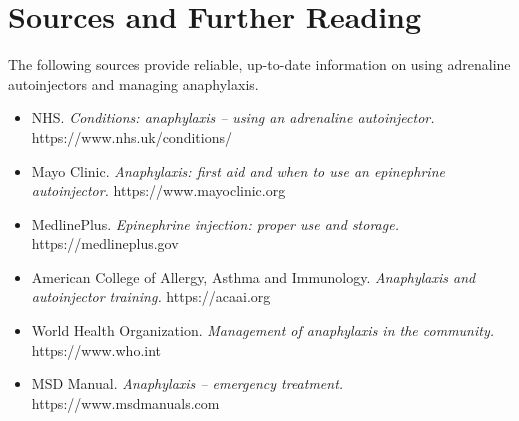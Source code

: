 \section*{Sources and Further Reading}
The following sources provide reliable, up-to-date information on using adrenaline autoinjectors and managing anaphylaxis.

\begin{itemize}
    \item NHS. \textit{Conditions: anaphylaxis -- using an adrenaline autoinjector.} https://www.nhs.uk/conditions/
    \item Mayo Clinic. \textit{Anaphylaxis: first aid and when to use an epinephrine autoinjector.} https://www.mayoclinic.org
    \item MedlinePlus. \textit{Epinephrine injection: proper use and storage.} https://medlineplus.gov
    \item American College of Allergy, Asthma and Immunology. \textit{Anaphylaxis and autoinjector training.} https://acaai.org
    \item World Health Organization. \textit{Management of anaphylaxis in the community.} https://www.who.int
    \item MSD Manual. \textit{Anaphylaxis -- emergency treatment.} https://www.msdmanuals.com
\end{itemize}
